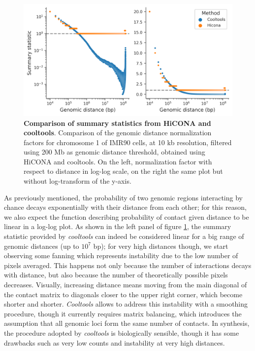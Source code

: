 \begin{figure}[ht]
  \centering
  \includegraphics[width=1\textwidth]{hicona_vs_cooltools.png}
  \caption{\textbf{Comparison of summary statistics from HiCONA and cooltools}. Comparison of the genomic distance normalization factors for chromosome 1 of IMR90 cells, at 10 kb resolution, filtered using 200 Mb as genomic distance threshold, obtained using HiCONA and cooltools. On the left, normalization factor with respect to distance in log-log scale, on the right the same plot but without log-transform of the y-axis.}
  \label{fig:cooltools}
\end{figure}

As previously mentioned, the probability of two genomic regions interacting by chance decays exponentially with their distance from each other; for this reason, we also expect the function describing probability of contact given distance to be linear in a log-log plot. As shown in the left panel of figure \ref{fig:cooltools}, the summary statistic provided by \textit{cooltools} can indeed be considered linear for a big range of genomic distances (up to $10^7$ bp); for very high distances though, we start observing some fanning which represents instability due to the low number of pixels averaged. This happens not only because the number of interactions decays with distance, but also because the number of theoretically possible pixels decreases. Visually, increasing distance means moving from the main diagonal of the contact matrix to diagonals closer to the upper right corner, which become shorter and shorter. \textit{Cooltools} allows to address this instability with a smoothing procedure, though it currently requires matrix balancing, which introduces the assumption that all genomic loci form the same number of contacts. In synthesis, the procedure adopted by \textit{cooltools} is biologically sensible, though it has some drawbacks such as very low counts and instability at very high distances.


